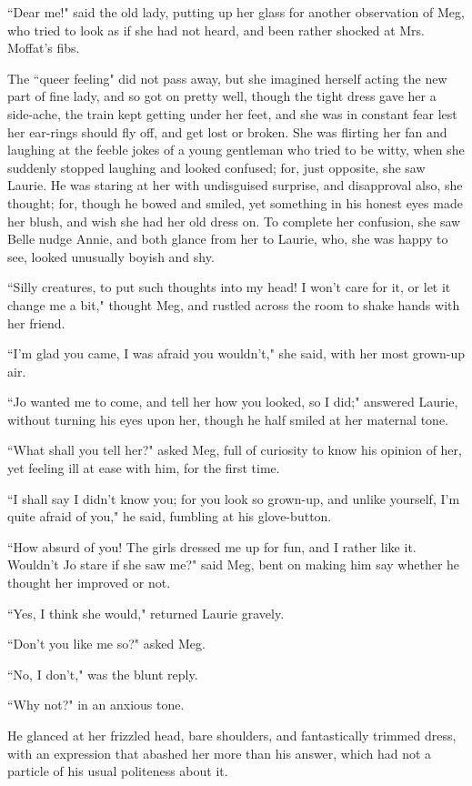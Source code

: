 ``Dear me!" said the old lady, putting up her glass for another
observation of Meg, who tried to look as if she had not heard, and been
rather shocked at Mrs. Moffat's fibs.

The ``queer feeling" did not pass away, but she imagined herself acting
the new part of fine lady, and so got on pretty well, though the tight
dress gave her a side-ache, the train kept getting under her feet, and
she was in constant fear lest her ear-rings should fly off, and get lost
or broken. She was flirting her fan and laughing at the feeble jokes of
a young gentleman who tried to be witty, when she suddenly stopped
laughing and looked confused; for, just opposite, she saw Laurie. He was
staring at her with undisguised surprise, and disapproval also, she
thought; for, though he bowed and smiled, yet something in his honest
eyes made her blush, and wish she had her old dress on. To complete her
confusion, she saw Belle nudge Annie, and both glance from her to
Laurie, who, she was happy to see, looked unusually boyish and shy.

``Silly creatures, to put such thoughts into my head! I
won't care for it, or let it change me a bit," thought
Meg, and rustled across the room to shake hands with her friend.

``I'm glad you came, I was afraid you
wouldn't," she said, with her most grown-up air.

``Jo wanted me to come, and tell her how you looked, so I did;" answered
Laurie, without turning his eyes upon her, though he half smiled at her
maternal tone.

``What shall you tell her?" asked Meg, full of curiosity to know his
opinion of her, yet feeling ill at ease with him, for the first time.

``I shall say I didn't know you; for you look so
grown-up, and unlike yourself, I'm quite afraid of you,"
he said, fumbling at his glove-button.

``How absurd of you! The girls dressed me up for fun, and I rather like
it. Wouldn't Jo stare if she saw me?" said Meg, bent on
making him say whether he thought her improved or not.

``Yes, I think she would," returned Laurie gravely.

``Don't you like me so?" asked Meg.

``No, I don't," was the blunt reply.

``Why not?" in an anxious tone.

He glanced at her frizzled head, bare shoulders, and fantastically
trimmed dress, with an expression that abashed her more than his answer,
which had not a particle of his usual politeness about it.

